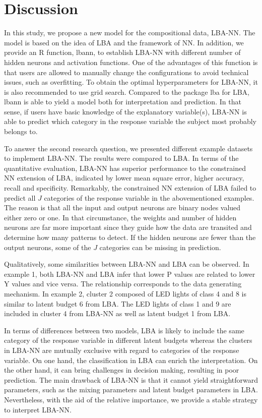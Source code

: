 \documentclass[]{interact}
\theoremstyle{plain}%
\theoremstyle{definition}
\theoremstyle{remark}
\begin{document}
\hypertarget{sec:dis}{%
\section{Discussion}\label{sec:dis}}

In this study, we propose a new model for the compositional data,
LBA-NN. The model is based on the idea of LBA and the framework of NN.
In addition, we provide an R function, \textsf{lbann}, to establish
LBA-NN with different number of hidden neurons and activation functions.
One of the advantages of this function is that users are allowed to
manually change the configurations to avoid technical issues, such as
overfitting. To obtain the optimal hyperparameters for LBA-NN, it is
also recommended to use grid search. Compared to the package
\textsf{lba} for LBA, \textsf{lbann} is able to yield a model both for
interpretation and prediction. In that sense, if users have basic
knowledge of the explanatory variable(s), LBA-NN is able to predict
which category in the response variable the subject most probably
belongs to.

To answer the second research question, we presented different example
datasets to implement LBA-NN. The results were compared to LBA. In terms
of the quantitative evaluation, LBA-NN has superior performance to the
constrained NN extension of LBA, indicated by lower mean square error,
higher accuracy, recall and specificity. Remarkably, the constrained NN
extension of LBA failed to predict all \(J\) categories of the response
variable in the abovementioned examples. The reason is that all the
input and output neurons are binary nodes valued either zero or one. In
that circumstance, the weights and number of hidden neurons are far more
important since they guide how the data are transited and determine how
many patterns to detect. If the hidden neurons are fewer than the output
neurons, some of the \(J\) categories can be missing in prediction.

Qualitatively, some similarities between LBA-NN and LBA can be observed.
In example 1, both LBA-NN and LBA infer that lower P values are related
to lower Y values and vice versa. The relationship corresponds to the
data generating mechanism. In example 2, cluster 2 composed of LED
lights of class 4 and 8 is similar to latent budget 6 from LBA. The LED
lights of class 1 and 9 are included in cluster 4 from LBA-NN as well as
latent budget 1 from LBA.

In terms of differences between two models, LBA is likely to include the
same category of the response variable in different latent budgets
whereas the clusters in LBA-NN are mutually exclusive with regard to
categories of the response variable. On one hand, the classification in
LBA can enrich the interpretation. On the other hand, it can bring
challenges in decision making, resulting in poor prediction. The main
drawback of LBA-NN is that it cannot yield straightforward parameters,
such as the mixing parameters and latent budget parameters in LBA.
Nevertheless, with the aid of the relative importance, we provide a
stable strategy to interpret LBA-NN.
\end{document}
